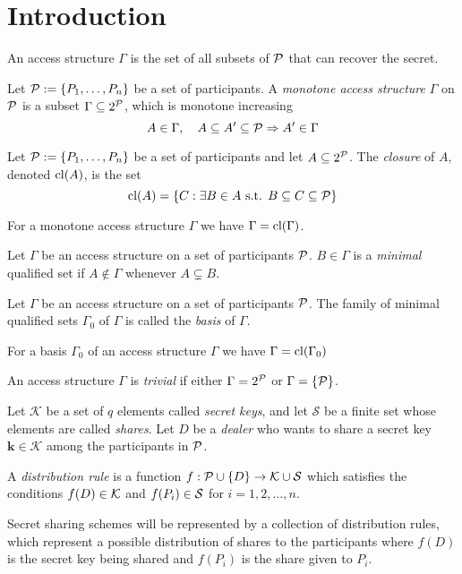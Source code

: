 \chapter{Introduction}

\cite{Phillips1992}
\cite{BlSt97}

An access structure $\Gamma$ is the set of all subsets of ${\mathcal P}$ that can recover the secret.

 Let ${\mathcal P} := \{ P_1, \dots, P_n \}$ be a set of participants. A \textit{monotone access structure} $\Gamma$ on ${\mathcal P}$ is a subset $\Gamma \subseteq 2^{{\mathcal P}}$, which is monotone increasing $$ A \in \Gamma, \quad A \subseteq A' \subseteq {\mathcal P} \Rightarrow A' \in \Gamma $$

 Let ${\mathcal P} := \{ P_1, \dots, P_n \}$ be a set of participants and let $A \subseteq 2^{{\mathcal P}}$. The \textit{closure} of $A$, denoted $\text{cl} (A)$, is the set $$ \text{cl} (A) = \{ C: \exists B \in A \text{ s.t. } B \subseteq C \subseteq {\mathcal P} \}$$

For a monotone access structure $\Gamma$ we have $\Gamma = \text{cl} (\Gamma)$.

 Let $\Gamma$ be an access structure on a set of participants ${\mathcal P}$. $B \in \Gamma$ is a \textit{minimal} qualified set if $A \notin \Gamma$ whenever $A \subsetneq B$.

 Let $\Gamma$ be an access structure on a set of participants ${\mathcal P}$. The family of minimal qualified sets $\Gamma_{0}$ of $\Gamma$ is called the \textit{basis} of $\Gamma$.

For a basis $\Gamma_0$ of an access structure $\Gamma$ we have $\Gamma = \text{cl} (\Gamma_{0})$

 An access structure $\Gamma$ is \textit{trivial} if either $\Gamma = 2^{{\mathcal P}}$ or $\Gamma = \{ {\mathcal P} \}$.

Let $\mathcal{K}$ be a set of $q$ elements called \textit{secret keys}, and let $\mathcal{S}$ be a finite set whose elements are called \textit{shares}. Let $D$ be a \textit{dealer} who wants to share a secret key $\mathbf{k} \in \mathcal{K}$ among the participants in ${\mathcal P}$. 

 A \textit{distribution rule} is a function $f : {\mathcal P} \cup \{ D \} \rightarrow \mathcal{K} \cup \mathcal{S}$ which satisfies the conditions $f(D) \in \mathcal{K}$ and $f(P_i) \in \mathcal{S}$ for $i = 1,2, \dots, n$.

Secret sharing schemes will be represented by a collection of distribution rules, which represent a possible distribution of shares to the participants where $f(D)$ is the secret key being shared and $f(P_i)$ is the share given to $P_i$.

